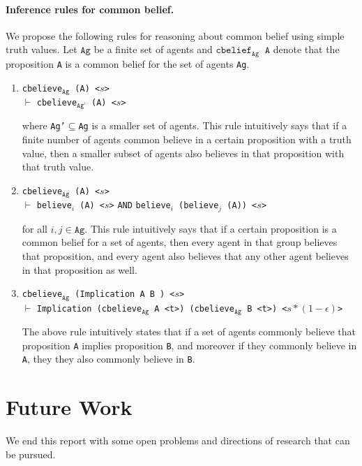 \documentclass[12pt]{article}
\begin{document}
\paragraph{Inference rules for common belief.} We propose the following rules for reasoning about common belief using simple truth values. Let $\texttt{Ag}$ be a finite set of agents and $\texttt{cbelief}_{\texttt{Ag}}\;\; \texttt{A}$ denote that the proposition \texttt{A} is a common belief for the set of agents \texttt{Ag}.
\begin{enumerate}
\item
\noindent \texttt{cbelieve$_\texttt{Ag}$ (A) <$s$>}\\
$\vdash$
\noindent \texttt{cbelieve$_\texttt{Ag'}$ (A)  <$s$>}

where \texttt{Ag'}$\subseteq$\texttt{Ag} is a smaller set of agents. This rule intuitively says that if a finite number of agents common believe in a certain proposition with a truth value, then a smaller subset of agents also believes in that proposition with that truth value. 
\item
\noindent \texttt{cbelieve$_\texttt{Ag}$ (A) <$s$>}\\
$\vdash$
\noindent \texttt{believe$_i$ (A)  <$s$>} \texttt{AND} \texttt{believe$_i$ (believe$_j$ (A))  <$s$>}

for all $i,j\in \texttt{Ag}$. This rule intuitively says that if a certain proposition is a common belief for a set of agents, then every agent in that group believes that proposition, and every agent also believes that any other agent believes in that proposition as well. 

\item
\texttt{cbelieve$_\texttt{Ag}$ (Implication A B ) <$s$>}\\
$\vdash$
\texttt{Implication (cbelieve$_\texttt{Ag}$ A <t>) (cbelieve$_\texttt{Ag}$ B <t>) <$s*(1-\epsilon)$>}

The above rule intuitively states that if a set of agents commonly believe that proposition \texttt{A} implies proposition \texttt{B}, and moreover if they commonly believe in \texttt{A}, they they also commonly believe in \texttt{B}.

\end{enumerate}
\section{Future Work}
We end this report with some open problems and directions of research that can be pursued. 
\end{document}

